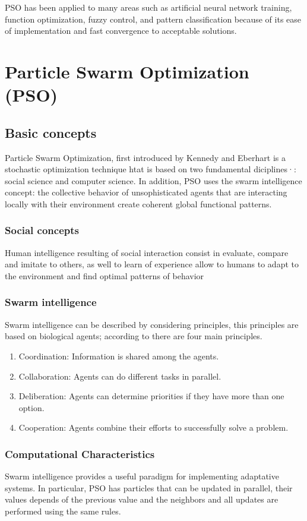 \documentclass[journal]{IEEEtran}
\begin{document}
PSO has been applied to many areas such as artificial neural network training, function optimization, fuzzy control, and pattern classification because of its ease of implementation and fast convergence to acceptable solutions.


\section{ Particle Swarm Optimization (PSO) }
\subsection{Basic concepts}
Particle Swarm Optimization, first introduced by Kennedy and Eberhart \cite{Kennedy1995} is a stochastic optimization technique htat is based on two fundamental diciplines·\cite{delValle2008}: social science and computer science. In addition, PSO uses the swarm intelligence concept: the collective behavior of unsophisticated agents that are interacting locally with their environment create coherent global functional patterns.

\subsubsection{ Social concepts }
Human intelligence resulting of social interaction consist in evaluate, compare and imitate to others, as well to learn of experience allow to humans to adapt to the environment and find optimal patterns of behavior

\subsubsection{ Swarm intelligence }
Swarm intelligence can be described by considering principles, this principles are based on biological agents; according to \cite{Garnier2007} there are four main principles.
\begin{enumerate}
    \item Coordination: Information is shared among the agents.
    \item Collaboration: Agents can do different tasks in parallel.
    \item Deliberation: Agents can determine priorities if they have more than one option.
    \item Cooperation: Agents combine their efforts to successfully solve a problem.
\end{enumerate}
\subsubsection{ Computational Characteristics }
Swarm intelligence provides a useful paradigm for implementing adaptative systems. In particular, PSO has particles that can be updated in parallel, their values depends of the previous value and the neighbors and all updates are performed using the same rules.
\end{document}
